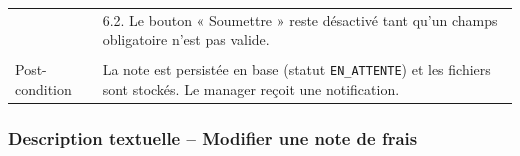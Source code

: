 \documentclass[12pt,a4paper]{report}
\begin{document}
\begin{longtable}{|p{3.5cm}|p{11cm}|}
& 6.2. Le bouton « Soumettre » reste désactivé tant qu'un champs obligatoire n'est pas valide. \\

& \\





\hline

Post-condition & La note est persistée en base (statut \texttt{EN\_ATTENTE}) et les fichiers sont stockés. Le manager reçoit une notification. \\

\hline

\end{longtable}



\newpage

\subsubsection{Description textuelle – Modifier une note de frais}


\label{tab:edit_expense_desc}
\end{document}
